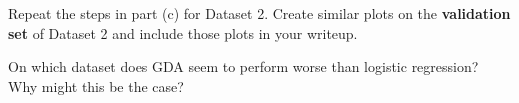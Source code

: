 \item {}
Repeat the steps in part (c) for Dataset 2. Create similar plots on
the \textbf{validation set} of Dataset 2 and include those plots in your writeup.

On which dataset does GDA seem to
perform worse than logistic regression? Why might this be the case?

